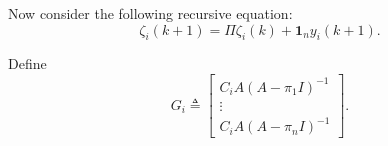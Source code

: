 \documentclass[journal]{IEEEtran}
\newtheorem{proposition}{\textbf{Proposition}}
\begin{document}
	Now consider the following recursive equation:
	$$
	\zeta_{i}(k+1)=\Pi \zeta_{i}(k)+\mathbf{1}_{n} y_{i}(k+1) .
	$$
	
	
	Define 
	\begin{equation}\label{eq:def_Gi}
		G_{i} \triangleq\left[\begin{array}{c}
			C_{i} A\left(A-\pi_{1} I\right)^{-1} \\
			\vdots \\
			C_{i} A\left(A-\pi_{n} I\right)^{-1}
		\end{array}\right].
	\end{equation}
	
\end{document}
